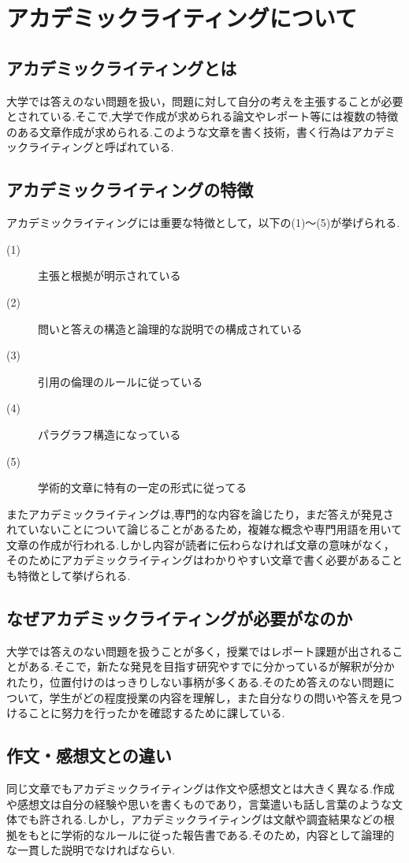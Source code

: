 \documentclass[a4j,12pt]{jarticle}
\begin{document}
\section{アカデミックライティングについて}
\subsection{アカデミックライティングとは}
大学では答えのない問題を扱い，問題に対して自分の考えを主張することが必要とされている.そこで,大学で作成が求められる論文やレポート等には複数の特徴のある文章作成が求められる.このような文章を書く技術，書く行為はアカデミックライティングと呼ばれている\cite{ren2}.
\subsection{アカデミックライティングの特徴}
アカデミックライティングには重要な特徴として，以下の(1)〜(5)が挙げられる.
\begin{description}
  \item[(1)] 主張と根拠が明示されている
  \item[(2)] 問いと答えの構造と論理的な説明での構成されている
  \item[(3)] 引用の倫理のルールに従っている
  \item[(4)] パラグラフ構造になっている
  \item[(5)] 学術的文章に特有の一定の形式に従ってる
 \end{description}
 またアカデミックライティングは,専門的な内容を論じたり，まだ答えが発見されていないことについて論じることがあるため，複雑な概念や専門用語を用いて文章の作成が行われる.しかし内容が読者に伝わらなければ文章の意味がなく，そのためにアカデミックライティングはわかりやすい文章で書く必要があることも特徴として挙げられる\cite{ren7}.
 
\subsection{なぜアカデミックライティングが必要がなのか}
大学では答えのない問題を扱うことが多く，授業ではレポート課題が出されることがある.そこで，新たな発見を目指す研究やすでに分かっているが解釈が分かれたり，位置付けのはっきりしない事柄が多くある.そのため答えのない問題について，学生がどの程度授業の内容を理解し，また自分なりの問いや答えを見つけることに努力を行ったかを確認するために課している.

\subsection{作文・感想文との違い}
同じ文章でもアカデミックライティングは作文や感想文とは大きく異なる.作成や感想文は自分の経験や思いを書くものであり，言葉遣いも話し言葉のような文体でも許される.しかし，アカデミックライティングは文献や調査結果などの根拠をもとに学術的なルールに従った報告書である.そのため，内容として論理的な一貫した説明でなければならい.
\end{document}
